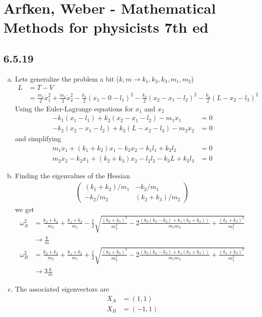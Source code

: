 \documentclass[../main.tex]{subfiles}
\begin{document}
\section{{\sc Arfken, Weber} - Mathematical Methods for physicists 7th ed}
\subsection{6.5.19}
\begin{enumerate}[(a)]
\item Lets generalize the problem a bit ($k,m \rightarrow k_1, k_2, k_3, m_1, m_2$)
\begin{align}
L&=T-V\\
&=
\frac{m_1}{2}\dot{x}_1^2
+\frac{m_1}{2}\dot{x}_2^2
-\frac{k_1}{2}(x_1-0-l_1)^2
-\frac{k_2}{2}(x_2-x_1-l_2)^2
-\frac{k_3}{2}(L-x_2-l_3)^2
\end{align}
Using the Euler-Lagrange equations for $x_1$ and $x_2$
\begin{align}
-k_1(x_1-l_1)+k_2(x_2-x_1-l_2)-m_1\ddot{x}_1&=0\\
-k_2(x_2-x_1-l_2)+k_3(L-x_2-l_3)-m_2\ddot{x}_2&=0
\end{align}
and simplifying
\begin{align}
m_1\ddot{x}_1+(k_1+k_2)x_1-k_2x_2-k_1l_1+k_2l_2&=0\\
m_2\ddot{x}_2-k_2x_1+(k_2+k_3)x_2-l_2l_2-k_3L+k_3l_3&=0
\end{align}
\item Finding the eigenvalues of the Hessian
\begin{align}
\left(\begin{array}{cc}
(k_1+k_2)/m_1 & -k_2/m_1\\
-k_2/m_2 & (k_2+k_3)/m_2
\end{array}\right)
\end{align}
we get
\begin{align}
\omega_A^2&=\frac{k_2+k_3}{m_2}+\frac{k_1+k_2}{m_1}-\frac{1}{2}\sqrt{\frac{(k_2+k_3)^3}{m_2^2}-2\frac{(k_2(k_3-k_2)+k_1(k_2+k_2))}{m_1m_2}+\frac{(k_1+k_2)^2}{m_1^2}}\\
&\rightarrow\frac{k}{m}\\
\omega_B^2&=\frac{k_2+k_3}{m_2}+\frac{k_1+k_2}{m_1}+\frac{1}{2}\sqrt{\frac{(k_2+k_3)^3}{m_2^2}-2\frac{(k_2(k_3-k_2)+k_1(k_2+k_2))}{m_1m_2}+\frac{(k_1+k_2)^2}{m_1^2}}\\
&\rightarrow3\frac{k}{m}
\end{align}

\item The associated eigenvectors are
\begin{align}
X_A&=(1,1)\\
X_B&=(-1,1)
\end{align}

\end{enumerate}
\end{document}
